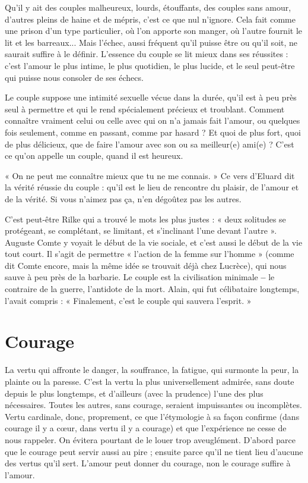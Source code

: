 Qu'il y ait des couples malheureux, lourds, étouffants, des couples sans
amour, d’autres pleins de haine et de mépris, c’est ce que nul n’ignore. Cela fait
comme une prison d’un type particulier, où l’on apporte son manger, où
l'autre fournit le lit et les barreaux... Mais l'échec, aussi fréquent qu’il puisse
être ou qu’il soit, ne saurait suffire à le définir. L’essence du couple se lit mieux
dans ses réussites : c’est l’amour le plus intime, le plus quotidien, le plus lucide,
et le seul peut-être qui puisse nous consoler de ses échecs.

Le couple suppose une intimité sexuelle vécue dans la durée, qu’il est à peu
près seul à permettre et qui le rend spécialement précieux et troublant. Comment
connaître vraiment celui ou celle avec qui on n’a jamais fait l'amour, ou
quelques fois seulement, comme en passant, comme par hasard ? Et quoi de
plus fort, quoi de plus délicieux, que de faire l’amour avec son ou sa meilleur(e)
ami(e) ? C’est ce qu’on appelle un couple, quand il est heureux.

« On ne peut me connaître mieux que tu ne me connais. » Ce vers d’Eluard
dit la vérité réussie du couple : qu’il est le lieu de rencontre du plaisir, de
l'amour et de la vérité. Si vous n’aimez pas ça, n’en dégoûtez pas les autres.

C’est peut-être Rilke qui a trouvé le mots les plus justes : « deux solitudes
se protégeant, se complétant, se limitant, et s’inclinant l’une devant l’autre ».
Auguste Comte y voyait le début de la vie sociale, et c’est aussi le début de la
vie tout court. Il s’agit de permettre « l’action de la femme sur l’homme »
(comme dit Comte encore, mais la même idée se trouvait déjà chez Lucrèce),
qui nous sauve à peu près de la barbarie. Le couple est la civilisation minimale
{\bf --} le contraire de la guerre, l’antidote de la mort. Alain, qui fut célibataire longtemps,
l’avait compris : « Finalement, c’est le couple qui sauvera l’esprit. »

\section{Courage}
La vertu qui affronte le danger, la souffrance, la fatigue, qui
surmonte la peur, la plainte ou la paresse. C’est la vertu la plus
universellement admirée, sans doute depuis le plus longtemps, et d’ailleurs
(avec la prudence) l’une des plus nécessaires. Toutes les autres, sans courage,
seraient impuissantes ou incomplètes. Vertu cardinale, donc, proprement, ce
que l’étymologie à sa façon confirme (dans courage il y a cœur, dans vertu il y
a courage) et que l'expérience ne cesse de nous rappeler. On évitera pourtant de
le louer trop aveuglément. D’abord parce que le courage peut servir aussi au
pire ; ensuite parce qu’il ne tient lieu d’aucune des vertus qu’il sert. L'amour
peut donner du courage, non le courage suffire à l'amour.

